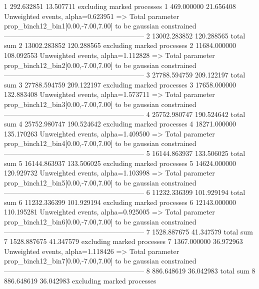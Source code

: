 1          292.632851      13.507711       excluding marked processes    
1          469.000000      21.656408       Unweighted events, alpha=0.623951
  => Total parameter prop_binch12_bin1[0.00,-7.00,7.00] to be gaussian constrained
------------------------------------------------------------
2          13002.283852    120.288565      total sum                     
2          13002.283852    120.288565      excluding marked processes    
2          11684.000000    108.092553      Unweighted events, alpha=1.112828
  => Total parameter prop_binch12_bin2[0.00,-7.00,7.00] to be gaussian constrained
------------------------------------------------------------
3          27788.594759    209.122197      total sum                     
3          27788.594759    209.122197      excluding marked processes    
3          17658.000000    132.883408      Unweighted events, alpha=1.573711
  => Total parameter prop_binch12_bin3[0.00,-7.00,7.00] to be gaussian constrained
------------------------------------------------------------
4          25752.980747    190.524642      total sum                     
4          25752.980747    190.524642      excluding marked processes    
4          18271.000000    135.170263      Unweighted events, alpha=1.409500
  => Total parameter prop_binch12_bin4[0.00,-7.00,7.00] to be gaussian constrained
------------------------------------------------------------
5          16144.863937    133.506025      total sum                     
5          16144.863937    133.506025      excluding marked processes    
5          14624.000000    120.929732      Unweighted events, alpha=1.103998
  => Total parameter prop_binch12_bin5[0.00,-7.00,7.00] to be gaussian constrained
------------------------------------------------------------
6          11232.336399    101.929194      total sum                     
6          11232.336399    101.929194      excluding marked processes    
6          12143.000000    110.195281      Unweighted events, alpha=0.925005
  => Total parameter prop_binch12_bin6[0.00,-7.00,7.00] to be gaussian constrained
------------------------------------------------------------
7          1528.887675     41.347579       total sum                     
7          1528.887675     41.347579       excluding marked processes    
7          1367.000000     36.972963       Unweighted events, alpha=1.118426
  => Total parameter prop_binch12_bin7[0.00,-7.00,7.00] to be gaussian constrained
------------------------------------------------------------
8          886.648619      36.042983       total sum                     
8          886.648619      36.042983       excluding marked processes    

